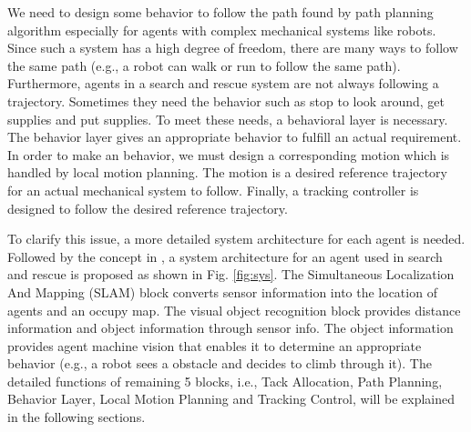 \documentclass{ieeeaccess}
\begin{document}
We need to design some behavior to follow the path found by path planning algorithm especially for agents with complex mechanical systems like robots. Since such a system has a high degree of freedom, there are many ways to follow the same path (e.g., a robot can walk or run to follow the same path). Furthermore, agents in a search and rescue system are not always following a trajectory. Sometimes they need the behavior such as stop to look around, get supplies and put supplies. To meet these needs, a behavioral layer is necessary. The behavior layer gives an appropriate behavior to fulfill an actual requirement. In order to make an behavior, we must design a corresponding motion which is handled by local motion planning. The motion is a desired reference trajectory for an actual mechanical system to follow. Finally, a tracking controller is designed to follow the desired reference trajectory.

To clarify this issue, a more detailed system architecture for each agent is needed. Followed by the concept in \cite{paden2016survey}, a system architecture for an agent used in search and rescue is proposed as shown in Fig. \ref{fig:sys}. The Simultaneous Localization And Mapping (SLAM) block converts sensor information into the location of agents and an occupy map. The visual object recognition block provides distance information and object information through sensor info. The object information provides agent machine vision that enables it to determine an appropriate behavior (e.g., a robot sees a obstacle and decides to climb through it). The detailed functions of remaining 5 blocks, i.e., Tack Allocation, Path Planning, Behavior Layer, Local Motion Planning and Tracking Control, will be explained in the following sections.

\end{document}
